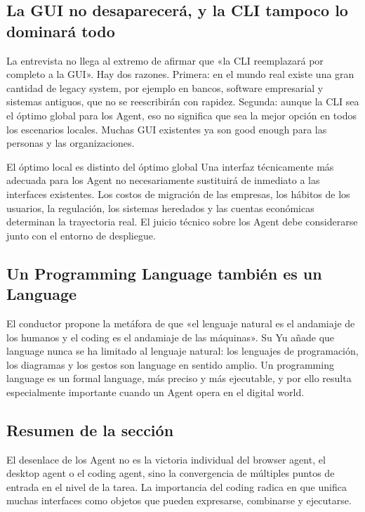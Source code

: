 \documentclass[a4paper]{article}
\begin{document}
\subsection{La GUI no desaparecerá, y la CLI tampoco lo dominará todo}

La entrevista no llega al extremo de afirmar que «la CLI reemplazará por completo a la GUI». Hay dos razones. Primera: en el mundo real existe una gran cantidad de legacy system, por ejemplo en bancos, software empresarial y sistemas antiguos, que no se reescribirán con rapidez. Segunda: aunque la CLI sea el óptimo global para los Agent, eso no significa que sea la mejor opción en todos los escenarios locales. Muchas GUI existentes ya son good enough para las personas y las organizaciones.

\begin{warningbox}{El óptimo local es distinto del óptimo global}
Una interfaz técnicamente más adecuada para los Agent no necesariamente sustituirá de inmediato a las interfaces existentes. Los costos de migración de las empresas, los hábitos de los usuarios, la regulación, los sistemas heredados y las cuentas económicas determinan la trayectoria real. El juicio técnico sobre los Agent debe considerarse junto con el entorno de despliegue.
\end{warningbox}

\subsection{Un Programming Language también es un Language}

El conductor propone la metáfora de que «el lenguaje natural es el andamiaje de los humanos y el coding es el andamiaje de las máquinas». Su Yu añade que language nunca se ha limitado al lenguaje natural: los lenguajes de programación, los diagramas y los gestos son language en sentido amplio. Un programming language es un formal language, más preciso y más ejecutable, y por ello resulta especialmente importante cuando un Agent opera en el digital world.

\subsection{Resumen de la sección}

El desenlace de los Agent no es la victoria individual del browser agent, el desktop agent o el coding agent, sino la convergencia de múltiples puntos de entrada en el nivel de la tarea. La importancia del coding radica en que unifica muchas interfaces como objetos que pueden expresarse, combinarse y ejecutarse.
\end{document}
